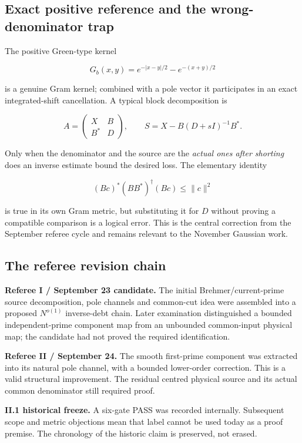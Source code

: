 \documentclass[
  10pt,
  a4paper,
  10pt,
  oneside,
  openany]{book}
\begin{document}
\subsection{Exact positive reference and the wrong-denominator
trap}\label{exact-positive-reference-and-the-wrong-denominator-trap}

The positive Green-type kernel

\[
G_b(x,y)=e^{-|x-y|/2}-e^{-(x+y)/2}
\tag{S5.5}\label{eq:S5.5}
\]

is a genuine Gram kernel; combined with a pole vector it participates in
an exact integrated-shift cancellation. A typical block decomposition is

\[
A=\begin{pmatrix}X&B\\B^*&D\end{pmatrix},
\qquad S=X-B(D+sI)^{-1}B^*.
\tag{S5.6}\label{eq:S5.6}
\]

Only when the denominator and the source are the \emph{actual ones after
shorting} does an inverse estimate bound the desired loss. The
elementary identity

\[
(Bc)^*(BB^*)^\dagger(Bc)\le\|c\|^2
\tag{S5.7}\label{eq:S5.7}
\]

is true in its own Gram metric, but substituting it for \(D\) without
proving a compatible comparison is a logical error. This is the central
correction from the September referee cycle and remains relevant to the
November Gaussian work.

\subsection{The referee revision
chain}\label{the-referee-revision-chain}

\textbf{Referee I / September 23 candidate.} The initial
Brehmer/current-prime source decomposition, pole channels and common-cut
idea were assembled into a proposed \(N^{o(1)}\) inverse-debt chain.
Later examination distinguished a bounded independent-prime component
map from an unbounded common-input physical map; the candidate had not
proved the required identification.

\textbf{Referee II / September 24.} The smooth first-prime component was
extracted into its natural pole channel, with a bounded lower-order
correction. This is a valid structural improvement. The residual centred
physical source and its actual common denominator still required proof.

\textbf{II.1 historical freeze.} A six-gate PASS was recorded
internally. Subsequent scope and metric objections mean that label
cannot be used today as a proof premise. The chronology of the historic
claim is preserved, not erased.
\end{document}
